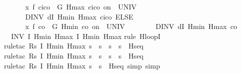 \documentclass[envcountsame,envcountsect]{llncs}
\begin{document}
\begin{example}
\begin{isabellebody}
\ \ \ \ \ \ {\isacharparenleft}x{\isasymacute}{\isacharequal}\ f\ {\isacharparenleft}c\isactrlsub i{\isacharminus}c\isactrlsub o{\isacharparenright}\ {\isacharampersand}\ G\ Hmax\ {\isacharparenleft}c\isactrlsub i{\isacharminus}c\isactrlsub o{\isacharparenright}\ on\ {\isacharbraceleft}{}{\isachardot}{\isachardot}{\isasymtau}{\isacharbraceright}\ UNIV\ {\isacharat}\ {}\isanewline 
\ \ \ \ \ \ DINV\ {\isacharparenleft}dI\ Hmin\ Hmax\ {\isacharparenleft}c\isactrlsub i{\isacharminus}c\isactrlsub o{\isacharparenright}{\isacharparenright}{\isacharparenright}\ ELSE\ \isanewline
\ \ \ \ \ \ {\isacharparenleft}x{\isasymacute}{\isacharequal}\ f\ {\isacharparenleft}{\isacharminus}c\isactrlsub o{\isacharparenright}\ {\isacharampersand}\ G\ Hmin\ {\isacharparenleft}{\isacharminus}c\isactrlsub o{\isacharparenright}\ on\ {\isacharbraceleft}{}{\isachardot}{\isachardot}{\isasymtau}{\isacharbraceright}\ UNIV\ {\isacharat}\ {}\isanewline 
\ \ \ \ \ \ DINV\ {\isacharparenleft}dI\ Hmin\ Hmax\ {\isacharparenleft}{\isacharminus}c\isactrlsub o{\isacharparenright}{\isacharparenright}{\isacharparenright}{\isacharparenright}\ {\isacharparenright}\isanewline
\ \ INV\ I\ Hmin\ Hmax{\isacharparenright}\ {\isasymlceil}I\ Hmin\ Hmax{\isasymrceil}{\isachardoublequoteclose}\isanewline
{}\isamarkupfalse%
{\isacharparenleft}rule\ H{\isacharunderscore}loopI{\isacharparenright}\isanewline
\ \ \ \ \isamarkupfalse%
{\isacharparenleft}rule{\isacharunderscore}tac\ R{\isacharequal}{\isachardoublequoteopen}{\isasymlambda}s{\isachardot}\ I\ Hmin\ Hmax\ s\ {\isasymand}\ s{\isachardollar}{}{\isacharequal}{}\ {\isasymand}\ s{\isachardollar}{}\ {\isacharequal}\ s{\isachardollar}{}{\isachardoublequoteclose}\ \ H{\isacharunderscore}seq{\isacharparenright}\isanewline
\ \ \ \ \ \isamarkupfalse%
{\isacharparenleft}rule{\isacharunderscore}tac\ R{\isacharequal}{\isachardoublequoteopen}{\isasymlambda}s{\isachardot}\ I\ Hmin\ Hmax\ s\ {\isasymand}\ s{\isachardollar}{}{\isacharequal}{}\ {\isasymand}\ s{\isachardollar}{}\ {\isacharequal}\ s{\isachardollar}{}{\isachardoublequoteclose}\ \ H{\isacharunderscore}seq{\isacharparenright}\isanewline
\ \ \ \ \ \ \isamarkupfalse%
{\isacharparenleft}rule{\isacharunderscore}tac\ R{\isacharequal}{\isachardoublequoteopen}{\isasymlambda}s{\isachardot}\ I\ Hmin\ Hmax\ s\ {\isasymand}\ s{\isachardollar}{}{\isacharequal}{}{\isachardoublequoteclose}\ \ H{\isacharunderscore}seq{\isacharcomma}\ simp{\isacharcomma}\ simp{\isacharparenright}\isanewline

\end{isabellebody}
\end{example}
\end{document}
